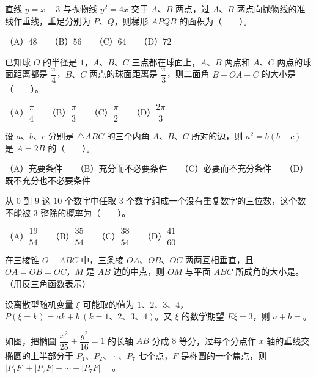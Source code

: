 \begin{question}
直线 $y=x-3$ 与抛物线 $y^2=4x$ 交于 $A\text{、}B$ 两点，过 $A\text{、}B$ 两点向抛物线的准线作垂线，垂足分别为 $P\text{、}Q$，则梯形 $APQB$ 的面积为\mbox{（　　）}。

（A）$48$　　（B）$56$　　（C）$64$　　（D）$72$

\end{question}
\begin{question}
已知球 $O$ 的半径是 $1$，$A\text{、}B\text{、}C$ 三点都在球面上，$A\text{、}B$ 两点和 $A\text{、}C$ 两点的球面距离都是 $\dfrac\pi4$，$B\text{、}C$ 两点的球面距离是 $\dfrac\pi3$，则二面角 $B-OA-C$ 的大小是\mbox{（　　）}。

（A）$\dfrac\pi4$　　（B）$\dfrac\pi3$　　（C）$\dfrac\pi2$　　（D）$\dfrac{2\pi}3$

\end{question}
\begin{question}
设 $a\text{、}b\text{、}c$ 分别是 $\triangle ABC$ 的三个内角 $A\text{、}B\text{、}C$ 所对的边，则 $a^2=b(b+c)$ 是 $A=2B$ 的\mbox{（　　）}。

（A）充要条件　　（B）充分而不必要条件　　（C）必要而不充分条件　　（D）既不充分也不必要条件

\end{question}
\begin{question}
从 $0$ 到 $9$ 这 $10$ 个数字中任取 $3$ 个数字组成一个没有重复数字的三位数，这个数不能被 $3$ 整除的概率为\mbox{（　　）}。

（A）$\dfrac{19}{54}$　　（B）$\dfrac{35}{54}$　　（C）$\dfrac{38}{54}$　　（D）$\dfrac{41}{60}$

\end{question}

\begin{question}
在三棱锥 $O-ABC$ 中，三条棱 $OA\text{、}OB\text{、}OC$ 两两互相垂直，且 $OA=OB=OC$，$M$ 是 $AB$ 边的中点，则 $OM$ 与平面 $ABC$ 所成角的大小是\gkblank{}。（用反三角函数表示）

\end{question}
\begin{question}
设离散型随机变量 $\xi$ 可能取的值为 $1\text{、}2\text{、}3\text{、}4$，$P(\xi=k)=ak+b\ (k=1\text{、}2\text{、}3\text{、}4)$。又 $\xi$ 的数学期望 $E\xi=3$，则 $a+b=$\gkblank{}。

\Needspace{0.4\textheight}
\end{question}
\begin{question}
如图，把椭圆 $\dfrac{x^2}{25}+\dfrac{y^2}{16}=1$ 的长轴 $AB$ 分成 $8$ 等分，过每个分点作 $x$ 轴的垂线交椭圆的上半部分于 $P_1\text{、}P_2\text{、}\cdots\text{、}P_7$ 七个点，$F$ 是椭圆的一个焦点，则 $|P_1F|+|P_2F|+\cdots+|P_7F|=$\gkblank{}。
\nopagebreak[4]
\begin{center}\end{center}
\nopagebreak[4]
\end{question}

